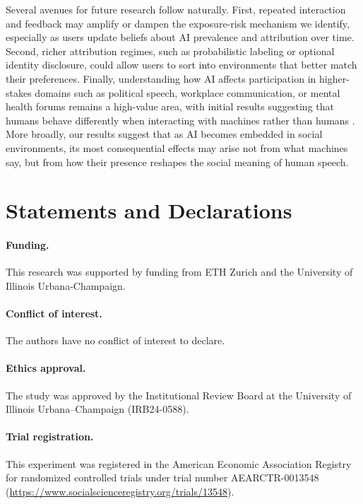 \documentclass[12pt,notitlepage]{article}
\theoremstyle{plain}
\theoremstyle{plain}
\theoremstyle{definition}
\theoremstyle{definition}
\theoremstyle{assumption}
\theoremstyle{plain}
\theoremstyle{plain}
\theoremstyle{plain}
\theoremstyle{plain}
\theoremstyle{definition}%
\theoremstyle{plain}
\theoremstyle{plain}
\theoremstyle{plain}
\theoremstyle{plain}
\begin{document}
Several avenues for future research follow naturally. First, repeated interaction and feedback may amplify or dampen the exposure-risk mechanism we identify, especially as users update beliefs about AI prevalence and attribution over time. Second, richer attribution regimes, such as probabilistic labeling or optional identity disclosure, could allow users to sort into environments that better match their preferences. Finally, understanding how AI affects participation in higher-stakes domains such as political speech, workplace communication, or mental health forums remains a high-value area, with initial results suggesting that humans behave differently when interacting with machines rather than humans \citep{marechal2020,chugunova2022we,bogliacino2023}. More broadly, our results suggest that as AI becomes embedded in social environments, its most consequential effects may arise not from what machines say, but from how their presence reshapes the social meaning of human speech.


\section*{Statements and Declarations}

\paragraph{Funding.}
This research was supported by funding from ETH Zurich and the University of Illinois Urbana-Champaign.

\paragraph{Conflict of interest.}
The authors have no conflict of interest to declare.

\paragraph{Ethics approval.}
The study was approved by the Institutional Review Board at the University of Illinois Urbana--Champaign (IRB24-0588).

\paragraph{Trial registration.}
This experiment was registered in the American Economic Association Registry for randomized controlled trials under trial number AEARCTR-0013548 (\url{https://www.socialscienceregistry.org/trials/13548}).
\end{document}
